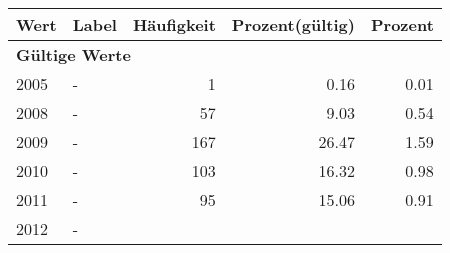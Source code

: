      \begin{longtable}{lXrrr}
     \toprule
     \textbf{Wert} & \textbf{Label} & \textbf{Häufigkeit} & \textbf{Prozent(gültig)} & \textbf{Prozent} \\
     \endhead
     \midrule
     \multicolumn{5}{l}{\textbf{Gültige Werte}}\\

     2005 &
     \multicolumn{1}{X}{ -  } &


       \num{1} &
       \num[round-mode=places,round-precision=2]{0.16} &
         \num[round-mode=places,round-precision=2]{0.01} \\

     2008 &
     \multicolumn{1}{X}{ -  } &


       \num{57} &
       \num[round-mode=places,round-precision=2]{9.03} &
         \num[round-mode=places,round-precision=2]{0.54} \\

     2009 &
     \multicolumn{1}{X}{ -  } &


       \num{167} &
       \num[round-mode=places,round-precision=2]{26.47} &
         \num[round-mode=places,round-precision=2]{1.59} \\

     2010 &
     \multicolumn{1}{X}{ -  } &


       \num{103} &
       \num[round-mode=places,round-precision=2]{16.32} &
         \num[round-mode=places,round-precision=2]{0.98} \\

     2011 &
     \multicolumn{1}{X}{ -  } &


       \num{95} &
       \num[round-mode=places,round-precision=2]{15.06} &
         \num[round-mode=places,round-precision=2]{0.91} \\

     2012 &
     \multicolumn{1}{X}{ -  } &



\end{longtable}
